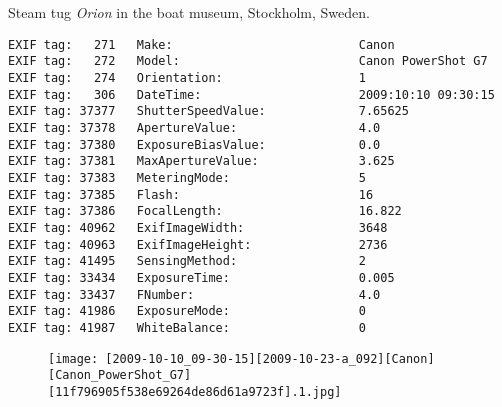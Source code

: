 \section{\protect{}}
\noindent Steam tug \emph{Orion} in the boat museum, Stockholm, Sweden.
\noindent
\begin{lstlisting}
EXIF tag:   271   Make:                          Canon
EXIF tag:   272   Model:                         Canon PowerShot G7
EXIF tag:   274   Orientation:                   1
EXIF tag:   306   DateTime:                      2009:10:10 09:30:15
EXIF tag: 37377   ShutterSpeedValue:             7.65625
EXIF tag: 37378   ApertureValue:                 4.0
EXIF tag: 37380   ExposureBiasValue:             0.0
EXIF tag: 37381   MaxApertureValue:              3.625
EXIF tag: 37383   MeteringMode:                  5
EXIF tag: 37385   Flash:                         16
EXIF tag: 37386   FocalLength:                   16.822
EXIF tag: 40962   ExifImageWidth:                3648
EXIF tag: 40963   ExifImageHeight:               2736
EXIF tag: 41495   SensingMethod:                 2
EXIF tag: 33434   ExposureTime:                  0.005
EXIF tag: 33437   FNumber:                       4.0
EXIF tag: 41986   ExposureMode:                  0
EXIF tag: 41987   WhiteBalance:                  0

\end{lstlisting}
\clearpage
\begin{figure}
\raggedleft
\texttt{[image: [2009-10-10\_09-30-15][2009-10-23-a\_092][Canon][Canon\_PowerShot\_G7][11f796905f538e69264de86d61a9723f].1.jpg]}
\end{figure}


\clearpage

